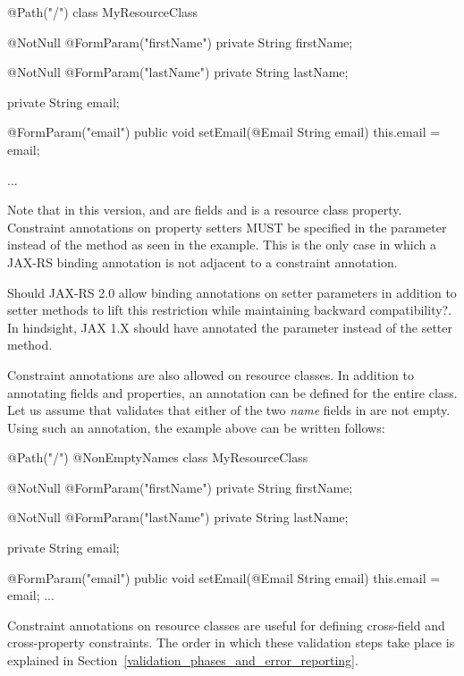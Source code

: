 \begin{listing}{1}
@Path("/")
class MyResourceClass {

    @NotNull @FormParam("firstName")
    private String firstName;

    @NotNull @FormParam("lastName")
    private String lastName;

    private String email;

    @FormParam("email")
    public void setEmail(@Email String email) {
        this.email = email;
    }

    ...
}
\end{listing}

Note that in this version,  and  are fields and  is a resource class property. Constraint annotations on property setters MUST be specified in the parameter instead of the method as seen in the example. This is the only case in which a JAX-RS binding annotation is not adjacent to a constraint annotation. 

\begin{ednote}
Should JAX-RS 2.0 allow binding annotations on setter parameters in addition to setter methods to lift this restriction while maintaining backward compatibility?. In hindsight, JAX 1.X should have annotated the parameter instead of the setter method.
\end{ednote}

Constraint annotations are also allowed on resource classes. In addition to annotating fields and properties, an annotation can be defined for the entire class. Let us assume that  validates that either of the two \emph{name} fields in  are not empty. Using such an annotation, the example above can be written follows:

\begin{listing}{1}
@Path("/")
@NonEmptyNames
class MyResourceClass {

    @NotNull @FormParam("firstName")
    private String firstName;

    @NotNull @FormParam("lastName")
    private String lastName;

    private String email;

    @FormParam("email")
    public void setEmail(@Email String email) {
        this.email = email;
    }
    ...
}
\end{listing}

Constraint annotations on resource classes are useful for defining cross-field and cross-property constraints. The order in which these validation steps take place is explained in Section~\ref{validation_phases_and_error_reporting}.

